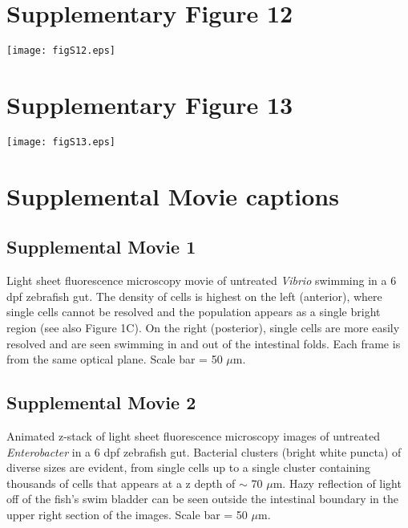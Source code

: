 \documentclass[12pt]{article}
\begin{document}
\newpage
\section*{Supplementary Figure 12}

\begin{figure*}[h!]
\centerline{
	\texttt{[image: figS12.eps]}} 
	
\end{figure*}

\newpage
\section*{Supplementary Figure 13}

\begin{figure*}[h!]
\centerline{
	\texttt{[image: figS13.eps]}} 
	
\end{figure*}
\newpage

\section*{Supplemental Movie captions}

\subsection*{Supplemental Movie 1} 
Light sheet fluorescence microscopy movie of untreated \textit{Vibrio} swimming in a 6 dpf zebrafish gut. The density of cells is highest on the left (anterior), where single cells cannot be resolved and the population appears as a single bright region (see also Figure 1C). On the right (posterior), single cells are more easily resolved and are seen swimming in and out of the intestinal folds. Each frame is from the same optical plane. Scale bar = 50 $\mu$m.

\subsection*{Supplemental Movie 2} 
Animated z-stack of light sheet fluorescence microscopy images of untreated \textit{Enterobacter} in a 6 dpf zebrafish gut. Bacterial clusters (bright white puncta) of diverse sizes are evident, from single cells up to a single cluster containing thousands of cells that appears at a z depth of $\sim$ 70 $\mu$m. Hazy reflection of light off of the fish's swim bladder can be seen outside the intestinal boundary in the upper right section of the images. Scale bar = 50 $\mu$m.
\end{document}
